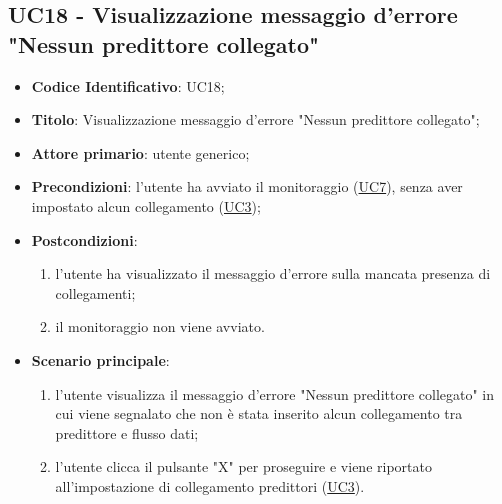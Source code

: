 	\subsection{UC18 - Visualizzazione messaggio d'errore "Nessun predittore collegato"}
		\begin{itemize}
			\item\textbf{Codice Identificativo}: UC18;
			\item\textbf{Titolo}: Visualizzazione messaggio d'errore "Nessun predittore collegato";
			\item\textbf{Attore primario}: utente generico;
			\item\textbf{Precondizioni}: l'utente ha avviato il monitoraggio (\hyperref[par:UC7]{UC7}), senza aver impostato alcun collegamento (\hyperref[par:UC3]{UC3});
			\item\textbf{Postcondizioni}:
				\begin{enumerate}
					\item l'utente ha visualizzato il messaggio d'errore sulla mancata presenza di collegamenti;	
					\item	il monitoraggio non viene avviato.
				\end{enumerate}
			\item\textbf{Scenario principale}:
				\begin{enumerate}
					\item l'utente visualizza il messaggio d'errore "Nessun predittore collegato" in cui viene segnalato che non è stata inserito alcun collegamento tra predittore e flusso dati;
					\item l'utente clicca il pulsante "X" per proseguire e viene riportato all'impostazione di collegamento predittori (\hyperref[par:UC3]{UC3}).		
				\end{enumerate}		
		\end{itemize}


	








